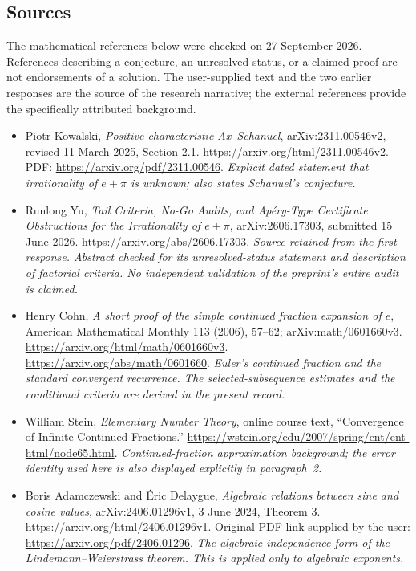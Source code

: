 \documentclass[11pt]{article}
\begin{document}
\subsection{Sources}
The mathematical references below were checked on 27 September 2026.
References describing a conjecture, an unresolved status, or a claimed
proof are not endorsements of a solution. The user-supplied text and the
two earlier responses are the source of the research narrative;
the external references provide the specifically attributed background.

\begin{itemize}
 \raggedright
 \item[S1] Piotr Kowalski, \emph{Positive characteristic Ax--Schanuel},
 arXiv:2311.00546v2, revised 11 March 2025, Section 2.1.
 \url{https://arxiv.org/html/2311.00546v2}.
 PDF:
 \url{https://arxiv.org/pdf/2311.00546}.
 \textit{Explicit dated statement that irrationality of $e+\pi$ is unknown;
 also states Schanuel's conjecture.}

 \item[S2] Runlong Yu, \emph{Tail Criteria, No-Go Audits, and Ap\'ery-Type
 Certificate Obstructions for the Irrationality of $e+\pi$},
 arXiv:2606.17303, submitted 15 June 2026.
 \url{https://arxiv.org/abs/2606.17303}.
 \textit{Source retained from the first response. Abstract checked for its
 unresolved-status statement and description of factorial criteria.
 No independent validation of the preprint's entire audit is claimed.}

 \item[E1] Henry Cohn, \emph{A short proof of the simple continued fraction
 expansion of $e$}, American Mathematical Monthly 113 (2006), 57--62;
 arXiv:math/0601660v3.
 \url{https://arxiv.org/html/math/0601660v3}.
 \url{https://arxiv.org/abs/math/0601660}.
 \textit{Euler's continued fraction and the standard convergent recurrence.
 The selected-subsequence estimates and the conditional criteria are
 derived in the present record.}

 \item[E2] William Stein, \emph{Elementary Number Theory}, online course
 text, ``Convergence of Infinite Continued Fractions.''
 \url{https://wstein.org/edu/2007/spring/ent/ent-html/node65.html}.
 \textit{Continued-fraction approximation background; the error identity
 used here is also displayed explicitly in paragraph~2.}

 \item[E3] Boris Adamczewski and \'Eric Delaygue,
 \emph{Algebraic relations between sine and cosine values},
 arXiv:2406.01296v1, 3 June 2024, Theorem 3.
 \url{https://arxiv.org/html/2406.01296v1}.
 Original PDF link supplied by the user:
 \url{https://arxiv.org/pdf/2406.01296}.
 \textit{The algebraic-independence form of the Lindemann--Weierstrass
 theorem. This is applied only to algebraic exponents.}


\end{itemize}
\end{document}
